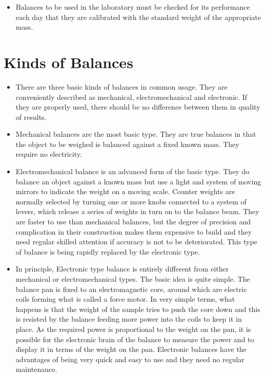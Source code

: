 \documentclass[]{book}
\providecommand{\tightlist}{%
  \setlength{\itemsep}{0pt}\setlength{\parskip}{0pt}}
\begin{document}
\begin{itemize}
\tightlist
\item
  Balances to be used in the laboratory must be checked for its
  performance each day that they are calibrated with the standard weight
  of the appropriate mass.
\end{itemize}

\section{Kinds of Balances}\label{kinds-of-balances}

\begin{itemize}
\tightlist
\item
  There are three basic kinds of balances in common usage. They are
  conveniently described as mechanical, electromechanical and
  electronic. If they are properly used, there should be no difference
  between them in quality of results.
\item
  Mechanical balances are the most basic type. They are true balances in
  that the object to be weighed is balanced against a fixed known mass.
  They require no electricity.
\item
  Electromechanical balance is an advanced form of the basic type. They
  do balance an object against a known mass but use a light and system
  of moving mirrors to indicate the weight on a moving scale. Counter
  weights are normally selected by turning one or more knobs connected
  to a system of levers, which release a series of weights in turn on to
  the balance beam. They are faster to use than mechanical balances, but
  the degree of precision and complication in their construction makes
  them expensive to build and they need regular skilled attention if
  accuracy is not to be deteriorated. This type of balance is being
  rapidly replaced by the electronic type.
\item
  In principle, Electronic type balance is entirely different from
  either mechanical or electromechanical types. The basic idea is quite
  simple. The balance pan is fixed to an electromagnetic core, around
  which are electric coils forming what is called a force motor. In very
  simple terms, what happens is that the weight of the sample tries to
  push the core down and this is resisted by the balance feeding more
  power into the coils to keep it in place. As the required power is
  proportional to the weight on the pan, it is possible for the
  electronic brain of the balance to measure the power and to display it
  in terms of the weight on the pan. Electronic balances have the
  advantages of being very quick and easy to use and they need no
  regular maintenance.
\end{itemize}
\end{document}
